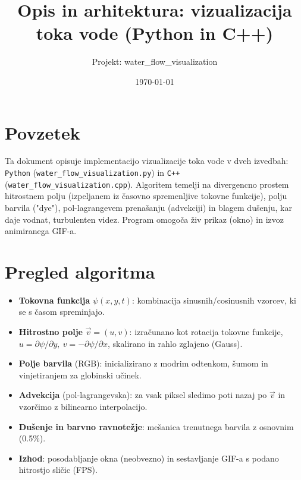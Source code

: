 \documentclass[11pt,a4paper]{article}
\title{Opis in arhitektura: vizualizacija toka vode (Python in C++)}
\author{Projekt: water\_flow\_visualization}
\date{\today}
\begin{document}
\maketitle

\section*{Povzetek}
Ta dokument opisuje implementacijo vizualizacije toka vode v dveh izvedbah: \texttt{Python} (\texttt{water\_flow\_visualization.py}) in \texttt{C++} (\texttt{water\_flow\_visualization.cpp}). Algoritem temelji na divergencno prostem hitrostnem polju (izpeljanem iz časovno spremenljive tokovne funkcije), polju barvila ("dye"), pol-lagrangevem prenašanju (advekciji) in blagem dušenju, kar daje vodnat, turbulenten videz. Program omogoča živ prikaz (okno) in izvoz animiranega GIF-a.

\section{Pregled algoritma}
\begin{itemize}[noitemsep]
  \item \textbf{Tokovna funkcija} \(\psi(x,y,t)\): kombinacija sinusnih/cosinusnih vzorcev, ki se s časom spreminjajo.
  \item \textbf{Hitrostno polje} \(\vec v = (u,v)\): izračunano kot rotacija tokovne funkcije, \(u = \partial\psi/\partial y,\ v = -\partial\psi/\partial x\), skalirano in rahlo zglajeno (Gauss).
  \item \textbf{Polje barvila} (RGB): inicializirano z modrim odtenkom, šumom in vinjetiranjem za globinski učinek.
  \item \textbf{Advekcija} (pol-lagrangevska): za vsak piksel sledimo poti nazaj po \(\vec v\) in vzorčimo z bilinearno interpolacijo.
  \item \textbf{Dušenje in barvno ravnotežje}: mešanica trenutnega barvila z osnovnim (0.5\%).
  \item \textbf{Izhod}: posodabljanje okna (neobvezno) in sestavljanje GIF-a s podano hitrostjo sličic (FPS).
\end{itemize}
\end{document}
